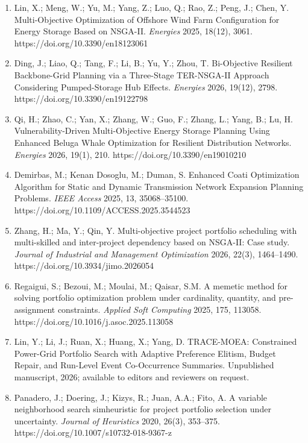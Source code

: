 \documentclass[
]{article}
\begin{document}
\begin{enumerate}
\item
  Lin, X.; Meng, W.; Yu, M.; Yang, Z.; Luo, Q.; Rao, Z.; Peng, J.; Chen, Y. Multi-Objective Optimization of Offshore Wind Farm Configuration for Energy Storage Based on NSGA-II. \emph{Energies} 2025, 18(12), 3061. https://doi.org/10.3390/en18123061
\item
  Ding, J.; Liao, Q.; Tang, F.; Li, B.; Yu, Y.; Zhou, T. Bi-Objective Resilient Backbone-Grid Planning via a Three-Stage TER-NSGA-II Approach Considering Pumped-Storage Hub Effects. \emph{Energies} 2026, 19(12), 2798. https://doi.org/10.3390/en19122798
\item
  Qi, H.; Zhao, C.; Yan, X.; Zhang, W.; Guo, F.; Zhang, L.; Yang, B.; Lu, H. Vulnerability-Driven Multi-Objective Energy Storage Planning Using Enhanced Beluga Whale Optimization for Resilient Distribution Networks. \emph{Energies} 2026, 19(1), 210. https://doi.org/10.3390/en19010210
\item
  Demirbas, M.; Kenan Dosoglu, M.; Duman, S. Enhanced Coati Optimization Algorithm for Static and Dynamic Transmission Network Expansion Planning Problems. \emph{IEEE Access} 2025, 13, 35068--35100. https://doi.org/10.1109/ACCESS.2025.3544523
\item
  Zhang, H.; Ma, Y.; Qin, Y. Multi-objective project portfolio scheduling with multi-skilled and inter-project dependency based on NSGA-II: Case study. \emph{Journal of Industrial and Management Optimization} 2026, 22(3), 1464--1490. https://doi.org/10.3934/jimo.2026054
\item
  Regaigui, S.; Bezoui, M.; Moulai, M.; Qaisar, S.M. A memetic method for solving portfolio optimization problem under cardinality, quantity, and pre-assignment constraints. \emph{Applied Soft Computing} 2025, 175, 113058. https://doi.org/10.1016/j.asoc.2025.113058
\item
  Lin, Y.; Li, J.; Ruan, X.; Huang, X.; Yang, D. TRACE-MOEA: Constrained Power-Grid Portfolio Search with Adaptive Preference Elitism, Budget Repair, and Run-Level Event Co-Occurrence Summaries. Unpublished manuscript, 2026; available to editors and reviewers on request.
\item
  Panadero, J.; Doering, J.; Kizys, R.; Juan, A.A.; Fito, A. A variable neighborhood search simheuristic for project portfolio selection under uncertainty. \emph{Journal of Heuristics} 2020, 26(3), 353--375. https://doi.org/10.1007/s10732-018-9367-z
\end{enumerate}
\end{document}
